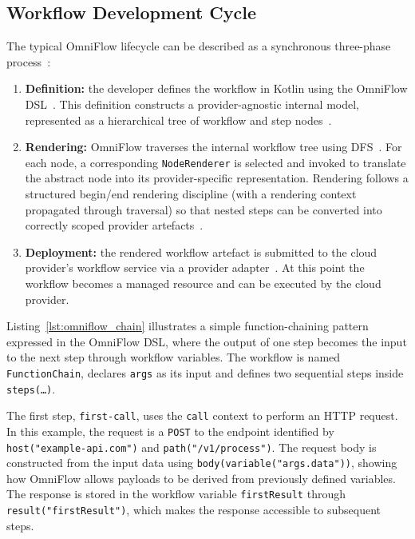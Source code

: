 \subsection{Workflow Development Cycle}
The typical OmniFlow lifecycle can be described as a synchronous three-phase process~\cite{costa2023omniflow,silva2025advanced}:

\begin{enumerate}
	\item \textbf{Definition:} the developer defines the workflow in Kotlin using the OmniFlow DSL~\cite{type-safe_builders}. This definition constructs a provider-agnostic internal model, represented as a hierarchical tree of workflow and step nodes~\cite{silva2025advanced}.

	\item \textbf{Rendering:} OmniFlow traverses the internal workflow tree using DFS~\cite{silva2025advanced}. For each node, a corresponding \texttt{NodeRenderer} is selected and invoked to translate the abstract node into its provider-specific representation. Rendering follows a structured begin/end rendering discipline (with a rendering context propagated through traversal) so that nested steps can be converted into correctly scoped provider artefacts~\cite{silva2025advanced}.

	\item \textbf{Deployment:} the rendered workflow artefact is submitted to the cloud provider’s workflow service via a provider adapter~\cite{costa2023omniflow}. At this point the workflow becomes a managed resource and can be executed by the cloud provider.
\end{enumerate}

Listing~\ref{lst:omniflow_chain} illustrates a simple function-chaining pattern expressed in the OmniFlow DSL, where the output of one step becomes the input to the next step through workflow variables. The workflow is named \texttt{FunctionChain}, declares \texttt{args} as its input and defines two sequential steps inside \texttt{steps(\ldots)}.

The first step, \texttt{first-call}, uses the \texttt{call} context to perform an HTTP request. In this example, the request is a \texttt{POST} to the endpoint identified by \texttt{host("example-api.com")} and \texttt{path("/v1/process")}. The request body is constructed from the input data using \texttt{body(variable("args.data"))}, showing how OmniFlow allows payloads to be derived from previously defined variables. The response is stored in the workflow variable \texttt{firstResult} through \texttt{result("firstResult")}, which makes the response accessible to subsequent steps.


